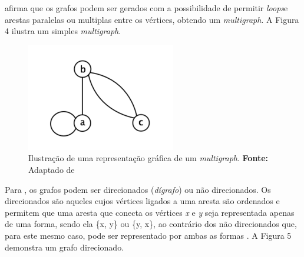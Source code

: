 \par {} afirma que os grafos podem ser gerados com a possibilidade de permitir \textit{loops}\footnotemark[4] e arestas paralelas ou multiplas entre os vértices, obtendo um \textit{multigraph}. A Figura 4 ilustra um simples \textit{multigraph}.


\begin{figure}[h!]
	\centerline{\includegraphics[scale=0.9]{./imagens/multigraph_example.png}}
	\caption[Ilustração de uma representação gráfica de um \textit{multigraph}]
	{Ilustração de uma representação gráfica de um \textit{multigraph}. \textbf{Fonte:} Adaptado de }
	\label{fig:exemplo1}
\end{figure}

\par Para , os grafos podem ser direcionados (\textit{dígrafo}) ou não direcionados. Os  direcionados são aqueles cujos vértices ligados a uma aresta são ordenados e permitem que uma aresta que conecta os vértices \textit{x} e \textit{y} seja representada apenas de uma forma, sendo ela \{x, y\} ou \{y, x\}, ao contrário dos não direcionados que, para este mesmo caso, pode ser representado por ambas as formas . A Figura 5 demonstra um grafo direcionado.

